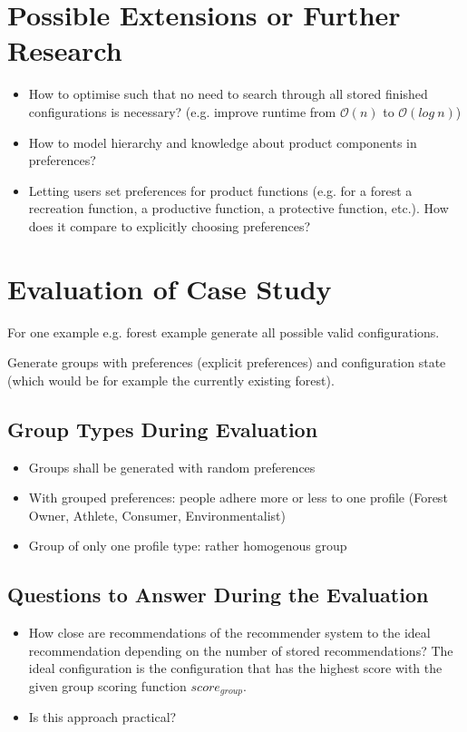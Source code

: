 \documentclass{article}
\begin{document}
\section{Possible Extensions or Further Research}

\begin{itemize}
    \item How to optimise such that no need to search through all stored finished configurations is necessary? (e.g. improve runtime from $\mathcal{O}(n)$ to $\mathcal{O}(log\ n)$)
    \item How to model hierarchy and knowledge about product components in preferences?
    \item Letting users set preferences for product functions (e.g. for a forest a recreation function, a productive function, a protective function, etc.). How does it compare to explicitly choosing preferences?
\end{itemize}
    
    
\section{Evaluation of Case Study}

For one example e.g. forest example generate all possible valid configurations.

Generate groups with preferences (explicit preferences) and configuration state (which would be for example the currently existing forest).

\subsection{Group Types During Evaluation}
\begin{itemize}
    \item Groups shall be generated with random preferences
    \item With grouped preferences: people adhere more or less to one profile (Forest Owner, Athlete, Consumer, Environmentalist)
    \item Group of only one profile type: rather homogenous group
\end{itemize}

\subsection{Questions to Answer During the Evaluation}

\begin{itemize}
    \item How close are recommendations of the recommender system to the ideal recommendation depending on the number of stored recommendations? The ideal configuration is the configuration that has the highest score with the given group scoring function $score_{group}$.
    \item Is this approach practical?
\end{itemize}
\end{document}
